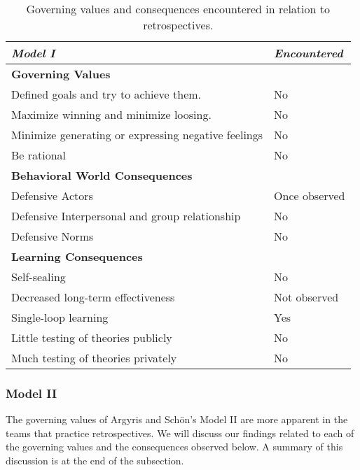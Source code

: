\begin{table}[h]
	\begin{center}
		\caption{Governing values and consequences encountered in relation to retrospectives.}
		\label{table:model-i-occurences}
		\begin{tabular}{l l}
			\hline
			\textit{Model I} & \textit{Encountered} \\
			\hline
			\textbf{Governing Values} & \\
			Defined goals and try to achieve them. & No \\
			Maximize winning and minimize loosing. & No \\
			Minimize generating or expressing negative feelings & No \\
			Be rational & No \\
			\hline
			\textbf{Behavioral World Consequences} & \\
			Defensive Actors & Once observed \\
			Defensive Interpersonal and group relationship & No \\
			Defensive Norms & No \\
			\hline
			\textbf{Learning Consequences} & \\
			Self-sealing & No \\
			Decreased long-term effectiveness & Not observed \\
			Single-loop learning & Yes \\
			Little testing of theories publicly & No \\
			Much testing of theories privately & No \\
			\hline
		\end{tabular}
	\end{center}
\end{table}

\subsubsection{Model II}
The governing values of Argyris and Schön's Model II are more apparent in the teams that practice retrospectives. We will discuss our findings related to each of the governing values and the consequences observed below. A summary of this discussion is at the end of the subsection. 

